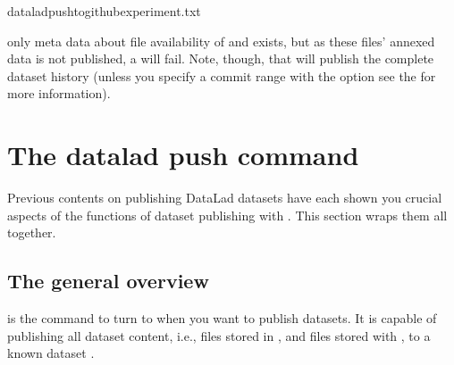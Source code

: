 \begin{sphinxVerbatim}[commandchars=\\\{\}]
dataladpush\PYGZhy{}\PYGZhy{}togithubexperiment.txt
\end{sphinxVerbatim}

\sphinxAtStartPar
only meta data about file availability of  and  exists, but as these files’ annexed data is not published, a 
will fail.
Note, though, that  will publish the complete dataset history (unless you specify a commit range with the  option \textendash{} see the  for more information).

\sphinxstepscope

\ignorespaces 

\section{The datalad push command}
\label{\detokenize{basics/101-141-push:the-datalad-push-command}}\label{\detokenize{basics/101-141-push:push}}\label{\detokenize{basics/101-141-push:index-0}}\label{\detokenize{basics/101-141-push::doc}}
\sphinxAtStartPar
Previous contents on publishing DataLad datasets have each
shown you crucial aspects of the functions of dataset publishing with
. This section wraps them all together.


\subsection{The general overview}
\label{\detokenize{basics/101-141-push:the-general-overview}}
\sphinxAtStartPar
{} is the command to turn to when you want to publish datasets.
It is capable of publishing all dataset content, i.e., files stored in {\hyperref[\detokenize{glossary:term-Git}]{}},
and files stored with {\hyperref[\detokenize{glossary:term-git-annex}]{}}, to a known dataset {\hyperref[\detokenize{glossary:term-sibling}]{}}.


